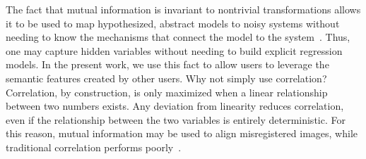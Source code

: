 \documentclass[journal]{vgtc}
\begin{document}
{The fact that mutual information is invariant to nontrivial transformations allows it to be used to map hypothesized, abstract models to noisy systems without needing to know the mechanisms that connect the model to the system~\cite{kuo2008gene,dunleavy2015mutual}. Thus, one may capture hidden variables without needing to build explicit regression models.  In the present work, we use this fact to allow users to leverage the semantic features created by other users. Why not simply use correlation? Correlation, by construction, is only maximized when a linear relationship between two numbers exists. Any deviation from linearity reduces correlation, even if the relationship between the two variables is entirely deterministic. For this reason, mutual information may be used to align misregistered images, while traditional correlation performs poorly~\cite{kim1997mutual}. 
}
\end{document}
